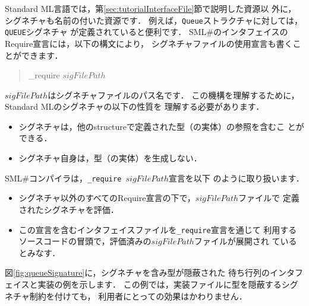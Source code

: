 \documentclass{jbook}
\newcommand{\smlsharp}{SML\#}
\newenvironment{program}{\begin{tt}\begin{quote}}{\end{quote}\end{tt}}
\begin{document}
	Standard ML言語では，第\ref{sec:tutorialInterfaceFile}節で説明した資源以
外に，シグネチャも名前の付いた資源です．
	例えば，{\tt Queue}ストラクチャに対しては，{\tt QUEUE}シグネチャ
が定義されていると便利です．
	\smlsharp{}のインタフェイスのRequire宣言には，以下の構文により，
シグネチャファイルの使用宣言も書くことができます．
\begin{program}
\_require $sigFilePath$
\end{program}
	$sigFilePath$はシグネチャファイルのパス名です．
	この機構を理解するために，Standard MLのシグネチャの以下の性質を
理解する必要があります．
\begin{itemize}
\item シグネチャは，他のstructureで定義された型（の実体）の参照を含むこ
とができる．
\item シグネチャ自身は，型（の実体）を生成しない．
\end{itemize}
	\smlsharp{}コンパイラは，{\tt \_require $sigFilePath$}宣言を以下
のように取り扱います．
\begin{itemize}
\item シグネチャ以外のすべてのRequire宣言の下で，$sigFilePath$ファイルで
定義されたシグネチャを評価．
\item この宣言を含むインタフェイスファイルを{\tt \_require}宣言を通じて
利用するソースコードの冒頭で，評価済みの$sigFilePath$ファイルが展開され
ているとみなす．
\end{itemize}
	図\ref{fig:queueSignature}に，シグネチャを含み型が隠蔽された
待ち行列のインタフェイスと実装の例を示します．
	この例では，実装ファイルに型を隠蔽するシグネチャ制約を付けても，
利用者にとっての効果はかわりません．
\end{document}
